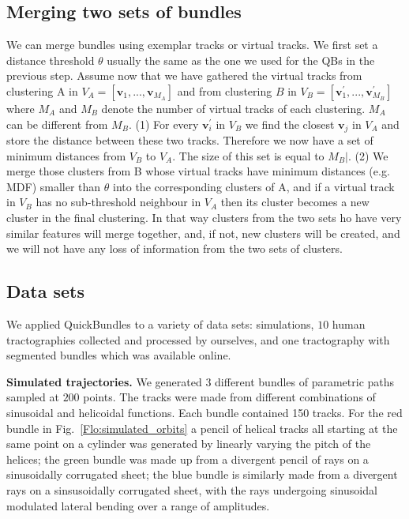 \documentclass[journal]{IEEEtran}
\begin{document}
\subsection{Merging two sets of bundles\label{sub:merging}}

We can merge bundles using exemplar tracks or virtual tracks. We first
set a distance threshold $\theta$ usually the same as the one we used
for the QBs in the previous step. Assume now that we have gathered the
virtual tracks from clustering A in $V_{A}=[\mathbf{v}_{1},...,\mathbf{v}_{M_{A}}]$
and from clustering $B$ in $V_{B}=[\mathbf{v}_{1}^{'},...,\mathbf{v}_{M_{B}}^{'}]$
where $M_A$ and $M_B$ denote the number of virtual tracks of each clustering.
$M_{A}$ can be different from $M_{B}$. (1) For every $\mathbf{v}_{i}^{'}$ in
$V_{B}$ we find the closest $\mathbf{v}_{j}$ in $V_{A}$ and store the
distance between these two tracks. Therefore we now have a set of
minimum distances from $V_{B}$ to $V_{A}$. The size of this set is equal
to $M_{B}|$. (2) We merge those clusters from B whose virtual
tracks have minimum distances (e.g. MDF) smaller than $\theta$ into the
corresponding clusters of A, and if a virtual track in $V_{B}$ has no
sub-threshold neighbour in $V_{A}$ then its cluster becomes a new
cluster in the final clustering. In that way clusters from the two sets
ho have very similar features will merge together, and, if not, new
clusters will be created, and we will not have any loss of information
from the two sets of clusters.

\subsection{\label{sub:QB-Data-sets}Data sets}

We applied QuickBundles to a variety of data sets: simulations, $10$ human
tractographies collected and processed by ourselves, and one tractography
with segmented bundles which was available online.

\textbf{Simulated trajectories.} We generated $3$ different bundles of
parametric paths sampled at $200$ points. The tracks were made from
different combinations of sinusoidal and helicoidal functions.  Each
bundle contained 150 tracks.  For the red bundle in
Fig.~\ref{Flo:simulated_orbits} a pencil of helical tracks all starting
at the same point on a cylinder was generated by linearly varying the
pitch of the helices; the green bundle was made up from a divergent
pencil of rays on a sinusoidally corrugated sheet; the blue bundle is
similarly made from a divergent rays on a sinsusoidally corrugated
sheet, with the rays undergoing sinusoidal modulated lateral bending
over a range of amplitudes.
\end{document}
